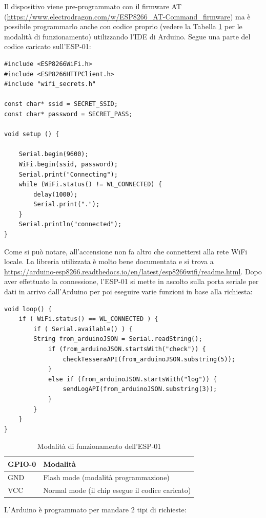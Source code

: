 \documentclass[12pt]{report}
\begin{document}
Il dispositivo viene pre-programmato con il firmware AT  (\url{https://www.electrodragon.com/w/ESP8266\_AT-Command\_firmware}) ma è possibile programmarlo anche con codice proprio (vedere la Tabella \ref{tab:esp01_modes} per le modalità di funzionamento) utilizzando l'IDE di Arduino. Segue una parte del codice caricato sull'ESP-01:

\begin{lstlisting}
#include <ESP8266WiFi.h>
#include <ESP8266HTTPClient.h>
#include "wifi_secrets.h"

const char* ssid = SECRET_SSID;
const char* password = SECRET_PASS;

void setup () {

	Serial.begin(9600);
	WiFi.begin(ssid, password);
	Serial.print("Connecting");
	while (WiFi.status() != WL_CONNECTED) {
		delay(1000);
		Serial.print(".");
	}
	Serial.println("connected");
}
\end{lstlisting}
Come si può notare, all'accensione non fa altro che connettersi alla rete WiFi locale. La libreria utilizzata è molto bene documentata e si trova a \url{https://arduino-esp8266.readthedocs.io/en/latest/esp8266wifi/readme.html}.
Dopo aver effettuato la connessione, l'ESP-01 si mette in ascolto sulla porta seriale per dati in arrivo dall'Arduino per poi eseguire varie funzioni in base alla richiesta:
\begin{lstlisting}
void loop() {
	if ( WiFi.status() == WL_CONNECTED ) {
		if ( Serial.available() ) {
		String from_arduinoJSON = Serial.readString();
			if (from_arduinoJSON.startsWith("check")) {
				checkTesseraAPI(from_arduinoJSON.substring(5));
			}
			else if (from_arduinoJSON.startsWith("log")) {
				sendLogAPI(from_arduinoJSON.substring(3));
			}
		}
	}
}
\end{lstlisting}
\begin{table}[h!]
	\begin{center}
		\begin{tabular}{l|l} 
			\textbf{GPIO-0} & \textbf{Modalità} \\
			\hline
			GND & Flash mode (modalità programmazione) \\
			VCC & Normal mode (il chip esegue il codice caricato) \\
		\end{tabular}
		\caption{Modalità di funzionamento dell'ESP-01}
		\label{tab:esp01_modes}
	\end{center}
\end{table}
L'Arduino è programmato per mandare 2 tipi di richieste:
\end{document}
